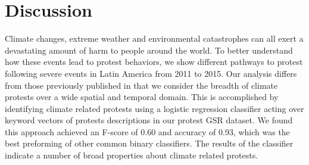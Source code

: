 \documentclass[9pt,twocolumn,twoside]{pnas-new}
\begin{document}
%
%



\section*{Discussion}
Climate changes, extreme weather and environmental catastrophes can all exert a devastating amount of harm to people around the world.
To better understand how these events lead to protest behaviors, we show different pathways to protest following severe events in Latin America from 2011 to 2015.
Our analysis differs from those previously published in that we consider the breadth of climate protests over a wide spatial and temporal domain.
This is accomplished by identifying climate related protests using a logistic regression classifier acting over keyword vectors of protests descriptions in our protest GSR dataset.
We found this approach achieved an F-score of 0.60 and accuracy of 0.93, which was the best preforming of other common binary classifiers.
The results of the classifier indicate a number of broad properties about climate related protests.
\end{document}
